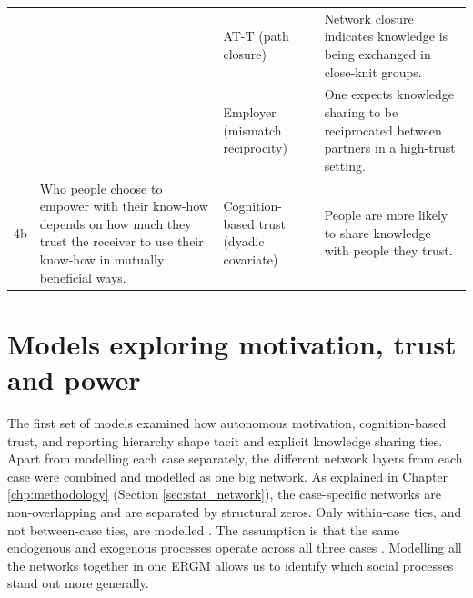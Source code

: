 \begin{table}
{\begin{tabular}{p{0.5cm} p{6cm} p{6cm} p{8cm}}
& & AT-T (path closure) & Network closure indicates knowledge is being exchanged in close-knit groups. \\
& & Employer (mismatch reciprocity) & One expects knowledge sharing to be reciprocated between partners in a high-trust setting. \\ \midrule
4b & Who people choose to empower with their know-how depends on how much they trust the receiver to use their know-how in mutually beneficial ways. & Cognition-based trust (dyadic covariate) & People are more likely to share knowledge with people they trust. \\ \bottomrule
\end{tabular}%
}
\end{table}

\section{Models exploring motivation, trust and power}

The first set of models examined how autonomous motivation, cognition-based trust, and reporting hierarchy shape tacit and explicit knowledge sharing ties. Apart from modelling each case separately, the different network layers from each case were combined and modelled as one big network. As explained in Chapter \ref{chp:methodology} (Section \ref{sec:stat_network}), the case-specific networks are non-overlapping and are separated by structural zeros. Only within-case ties, and not between-case ties, are modelled \citep{lusher2012trust}. The assumption is that the same endogenous and exogenous processes operate across all three cases \citep{kalish2013brain}. Modelling all the networks together in one ERGM allows us to identify which social processes stand out more generally. \medskip

